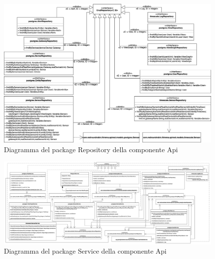 		\begin{landscape}
		\begin{figure}[H]
			\centering
			\includegraphics[scale=0.550]{res/images/API/RepositoryPackage.png}
			\caption{Diagramma del package Repository della componente Api}
			\label{Diagramma 15}
		\end{figure}
		\begin{figure}[H]
			\centering
			\includegraphics[scale=0.300]{res/images/API/ServicePackage.png}
			\caption{Diagramma del package Service della componente Api}
			\label{Diagramma 16}
		\end{figure}
		

\end{landscape}
